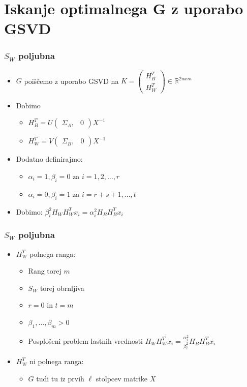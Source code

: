 \documentclass{beamer}
\begin{document}
\section{Iskanje optimalnega G z uporabo GSVD}
\begin{frame}
\frametitle{$S_W$ poljubna} 
\begin{itemize}
\item $G$ poiščemo z uporabo GSVD na $K = \left(\begin{array}{c} H_B^T \\ H_W^T \end{array}\right) \in \mathbb{R}^{2nxm}$
\item Dobimo 
\begin{itemize}
\item $H_B^T = U \left(\begin{array}{cc} \Sigma_A, & 0 \end{array}\right) X^{-1} $
\item $H_W^T = V \left(\begin{array}{cc} \Sigma_B, & 0 \end{array}\right) X^{-1} $
\end{itemize}
\item Dodatno definirajmo:
\begin{itemize}
\item $\alpha_i = 1, \beta_i = 0$ za $i = 1,2, \ldots, r$ 
\item $\alpha_i = 0, \beta_i = 1$ za $i = r+s+1, \ldots, t$ 
\end{itemize}
\item Dobimo: $\beta_i ^2  H_W H_W^T x_i = \alpha_i^2  H_B H_B^T x_i$
\end{itemize}
\end{frame}

\begin{frame}
\frametitle{$S_W$ poljubna} 
\begin{itemize}
\item $H_W^T$ polnega ranga:
\begin{itemize}
\item Rang torej $m$
\item $S_W$ torej obrnljiva
\item $r = 0$ in $t = m$ 
\item $\beta_1, \ldots, \beta_m > 0$
\item Posplošeni problem lastnih vrednosti $H_W H_W^T x_i = \frac{\alpha_i^2}{\beta_i ^2} H_B H_B^T x_i$
\end{itemize}
\item $H_W^T$ ni polnega ranga:
\begin{itemize}
\item $G$ tudi tu iz prvih $\ell$ stolpcev matrike $X$
\end{itemize}
\end{itemize}
\end{frame}
\end{document}
